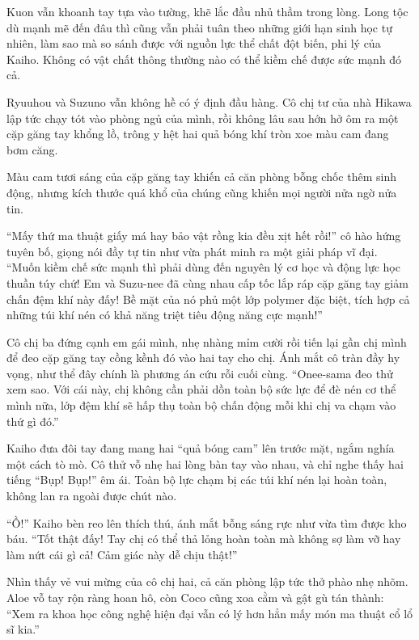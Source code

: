 ﻿\documentclass[../main.tex]{subfiles}
\begin{document}
Kuon vẫn khoanh tay tựa vào tường, khẽ lắc đầu nhủ thầm trong lòng. Long tộc dù mạnh mẽ đến đâu thì cũng vẫn phải tuân theo những giới hạn sinh học tự nhiên, làm sao mà so sánh được với nguồn lực thể chất đột biến, phi lý của Kaiho. Không có vật chất thông thường nào có thể kiềm chế được sức mạnh đó cả.

\ct

Ryuuhou và Suzuno vẫn không hề có ý định đầu hàng. Cô chị tư của nhà Hikawa lập tức chạy tót vào phòng ngủ của mình, rồi không lâu sau hớn hở ôm ra một cặp găng tay khổng lồ, trông y hệt hai quả bóng khí tròn xoe màu cam đang bơm căng.

Màu cam tươi sáng của cặp găng tay khiến cả căn phòng bỗng chốc thêm sinh động, nhưng kích thước quá khổ của chúng cũng khiến mọi người nửa ngờ nửa tin.

``Mấy thứ ma thuật giấy má hay bảo vật rồng kia đều xịt hết rồi!'' cô hào hứng tuyên bố, giọng nói đầy tự tin như vừa phát minh ra một giải pháp vĩ đại. ``Muốn kiềm chế sức mạnh thì phải dùng đến nguyên lý cơ học và động lực học thuần túy chứ! Em và Suzu-nee đã cùng nhau cấp tốc lắp ráp cặp găng tay giảm chấn đệm khí này đấy! Bề mặt của nó phủ một lớp polymer đặc biệt, tích hợp cả những túi khí nén có khả năng triệt tiêu động năng cực mạnh!''

Cô chị ba đứng cạnh em gái mình, nhẹ nhàng mỉm cười rồi tiến lại gần chị mình để đeo cặp găng tay cồng kềnh đó vào hai tay cho chị. Ánh mắt cô tràn đầy hy vọng, như thể đây chính là phương án cứu rỗi cuối cùng. ``Onee-sama đeo thử xem sao. Với cái này, chị không cần phải dồn toàn bộ sức lực để đè nén cơ thể mình nữa, lớp đệm khí sẽ hấp thụ toàn bộ chấn động mỗi khi chị va chạm vào thứ gì đó.''

Kaiho đưa đôi tay đang mang hai ``quả bóng cam'' lên trước mặt, ngắm nghía một cách tò mò. Cô thử vỗ nhẹ hai lòng bàn tay vào nhau, và chỉ nghe thấy hai tiếng ``Bụp! Bụp!'' êm ái. Toàn bộ lực chạm bị các túi khí nén lại hoàn toàn, không lan ra ngoài được chút nào.

``Ồ!'' Kaiho bèn reo lên thích thú, ánh mắt bỗng sáng rực như vừa tìm được kho báu. ``Tốt thật đấy! Tay chị có thể thả lỏng hoàn toàn mà không sợ làm vỡ hay làm nứt cái gì cả! Cảm giác này dễ chịu thật!''

Nhìn thấy vẻ vui mừng của cô chị hai, cả căn phòng lập tức thở phào nhẹ nhõm. Aloe vỗ tay rộn ràng hoan hô, còn Coco cũng xoa cằm và gật gù tán thành: ``Xem ra khoa học công nghệ hiện đại vẫn có lý hơn hẳn mấy món ma thuật cổ lổ sĩ kia.''
\end{document}

